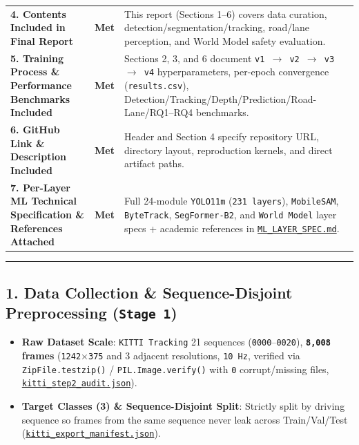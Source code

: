 \documentclass[10.5pt,a4paper]{article}
\begin{document}
\begin{footnotesize}
\begin{longtable}{>{\raggedright\arraybackslash}p{} >{\raggedright\arraybackslash}p{} >{\raggedright\arraybackslash}p{}}
\textbf{4. Contents Included in Final Report} & \textbf{Met} & This report (Sections 1--6) covers data curation, detection/segmentation/tracking, road/lane perception, and World Model safety evaluation. \\
\textbf{5. Training Process \& Performance Benchmarks Included} & \textbf{Met} & Sections 2, 3, and 6 document \texttt{v1 $\rightarrow$ v2 $\rightarrow$ v3 $\rightarrow$ v4} hyperparameters, per-epoch convergence (\texttt{results.\allowbreak{}csv}), Detection/Tracking/Depth/Prediction/Road-Lane/RQ1--RQ4 benchmarks. \\
\textbf{6. GitHub Link \& Description Included} & \textbf{Met} & Header and Section 4 specify repository URL, directory layout, reproduction kernels, and direct artifact paths. \\
\textbf{7. Per-Layer ML Technical Specification \& References Attached} & \textbf{Met} & Full 24-module \texttt{YOLO11m} (\texttt{231 layers}), \texttt{MobileSAM}, \texttt{ByteTrack}, \texttt{SegFormer-\allowbreak{}B2}, and \texttt{World Model} layer specs + academic references in \href{https://github.com/Heisnotanimposter/Totalcare\_autonomous\_driving\_Yolov5/blob/main/ML\_LAYER\_SPEC.md}{\texttt{ML\_\allowbreak{}LAYER\_\allowbreak{}SPEC.\allowbreak{}md}}. \\
\end{longtable}
\end{footnotesize}


\par\noindent\rule{\textwidth}{0.4pt}\par\medskip

\subsection{1. Data Collection \& Sequence-Disjoint Preprocessing (\texttt{Stage 1})}

\begin{itemize}[leftmargin=1.5em,itemsep=2pt]
\item \textbf{Raw Dataset Scale}: \texttt{KITTI Tracking} 21 sequences (\texttt{0000}--\texttt{0020}), \textbf{\texttt{8,\allowbreak{}008} frames} (\texttt{1242$\times$375} and 3 adjacent resolutions, \texttt{10 Hz}, verified via \texttt{ZipFile.\allowbreak{}testzip()} / \texttt{PIL.\allowbreak{}Image.\allowbreak{}verify()} with \texttt{0} corrupt/missing files, \href{https://github.com/Heisnotanimposter/Totalcare\_autonomous\_driving\_Yolov5/blob/main/results/v2\_improved/outputs/kitti\_step2\_audit.json}{\texttt{kitti\_\allowbreak{}step2\_\allowbreak{}audit.\allowbreak{}json}}).
\item \textbf{Target Classes (3) \& Sequence-Disjoint Split}: Strictly split by driving sequence so frames from the same sequence never leak across Train/Val/Test (\href{https://github.com/Heisnotanimposter/Totalcare\_autonomous\_driving\_Yolov5/blob/main/results/v2\_improved/outputs/kitti\_export\_manifest.json}{\texttt{kitti\_\allowbreak{}export\_\allowbreak{}manifest.\allowbreak{}json}}).
\end{itemize}
\end{document}
